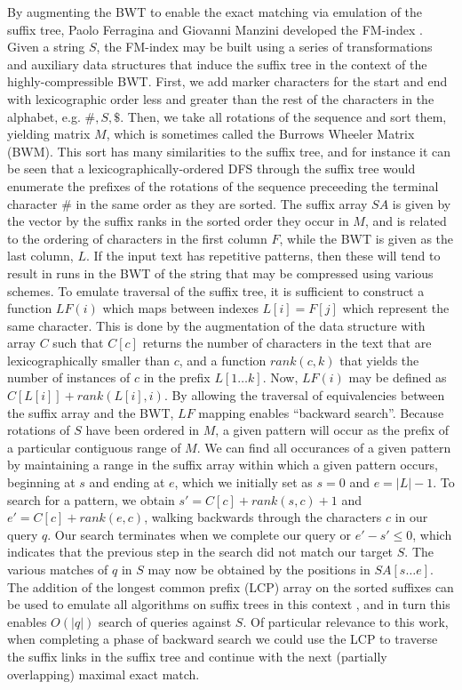 By augmenting the BWT to enable the exact matching via emulation of the suffix tree, Paolo Ferragina and Giovanni Manzini developed the FM-index \cite{ferragina2000opportunistic,ferragina2004alphabet}.
Given a string $S$, the FM-index may be built using a series of transformations and auxiliary data structures that induce the suffix tree in the context of the highly-compressible BWT.
First, we add marker characters for the start and end with lexicographic order less and greater than the rest of the characters in the alphabet, e.g. $\#,S,\$$.
Then, we take all rotations of the sequence and sort them, yielding matrix $M$, which is sometimes called the Burrows Wheeler Matrix (BWM).
This sort has many similarities to the suffix tree, and for instance it can be seen that a lexicographically-ordered DFS through the suffix tree would enumerate the prefixes of the rotations of the sequence preceeding the terminal character $\#$ in the same order as they are sorted.
The suffix array $SA$ is given by the vector by the suffix ranks in the sorted order they occur in $M$, and is related to the ordering of characters in the first column $F$, while the BWT is given as the last column, $L$.
If the input text has repetitive patterns, then these will tend to result in runs in the BWT of the string that may be compressed using various schemes.
To emulate traversal of the suffix tree, it is sufficient to construct a function $LF(i)$ which maps between indexes $L[i] = F[j]$ which represent the same character.
This is done by the augmentation of the data structure with array $C$ such that $C[c]$ returns the number of characters in the text that are lexicographically smaller than $c$, and a function $rank(c,k)$ that yields the number of instances of $c$ in the prefix $L[1 \ldots k]$.
Now, $LF(i)$ may be defined as $C[L[i]] + rank(L[i], i)$.
By allowing the traversal of equivalencies between the suffix array and the BWT, $LF$ mapping enables ``backward search''.
Because rotations of $S$ have been ordered in $M$, a given pattern will occur as the prefix of a particular contiguous range of $M$.
We can find all occurances of a given pattern by maintaining a range in the suffix array within which a given pattern occurs, beginning at $s$ and ending at $e$, which we initially set as $s=0$ and $e=|L|-1$.
To search for a pattern, we obtain $s' = C[c] + rank(s,c) + 1$ and $e' = C[c] + rank(e,c)$, walking backwards through the characters $c$ in our query $q$.
Our search terminates when we complete our query or $e' - s' \leq 0$, which indicates that the previous step in the search did not match our target $S$.
The various matches of $q$ in $S$ may now be obtained by the positions in $SA[s \ldots e]$.
The addition of the longest common prefix (LCP) array on the sorted suffixes can be used to emulate all algorithms on suffix trees in this context \cite{abouelhoda2004replacing}, and in turn this enables $O(|q|)$ search of queries against $S$.
Of particular relevance to this work, when completing a phase of backward search we could use the LCP to traverse the suffix links in the suffix tree and continue with the next (partially overlapping) maximal exact match.

